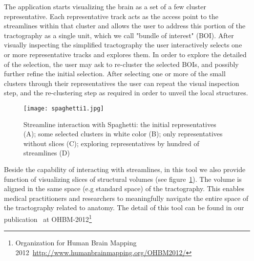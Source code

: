 The application starts visualizing the brain as a set of a few cluster representative.
Each representative track acts as the access point to the streamlines within that cluster and allows the user to address this portion of the tractography as a single unit, which we call "bundle of interest" (BOI). After visually inspecting the simplified tractography the user interactively selects one or more representative tracks and explores them.
In order to explore the detailed %
of the selection, the user may ask to re-cluster the selected BOIs, and possibly further refine the initial selection.
After selecting one or more of the small clusters through their representatives the user can repeat the visual inspection step, and the re-clustering step as required in order to unveil the local structures.
\begin{figure}
	\centering
	\texttt{[image: spaghetti1.jpg]} %
	\caption{Streamline interaction with Spaghetti: the initial representatives (A); some selected clusters in white color (B); only representatives without slices (C); exploring representatives by hundred of streamlines (D)}
  \label{fig:spaghetti}
\end{figure}
Beside the capability of interacting with streamlines, in this tool we also provide function of visualizing slices of structural volumes (see figure~\ref{fig:spaghetti}). The volume is aligned in the same space (e.g standard space) of the tractography.
This enables medical practitioners and researchers to meaningfully navigate the entire space of the tractography related to anatomy. The detail of this tool can be found in our publication~\cite{garyfallidis2012software}  at OHBM-2012\footnote{Organization for Human Brain Mapping 2012~\url{http://www.humanbrainmapping.org/OHBM2012/}}
